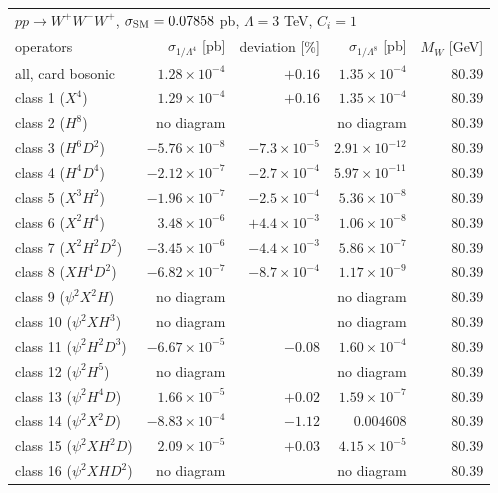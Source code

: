 \begin{table}[t]\centering\footnotesize\setlength{\tabcolsep}{4pt}
\begin{tabular}{@{}lrrrr@{}}\hline
\multicolumn{5}{l}{$p p \to W^+ W^- W^+$, $\sigma_{\rm SM} = 0.07858$ pb, $\Lambda = 3$ TeV, $C_i = 1$}\\
operators & $\sigma_{1/\Lambda^4}$ [pb] & deviation [\%] & $\sigma_{1/\Lambda^8}$ [pb] & $M_W$ [GeV]\\\hline
all, card bosonic & $1.28\times 10^{-4}$ & $+0.16$ & $1.35\times 10^{-4}$ & $80.39$\\
class 1 ($X^4$) & $1.29\times 10^{-4}$ & $+0.16$ & $1.35\times 10^{-4}$ & $80.39$\\
class 2 ($H^8$) & no diagram &  & no diagram & $80.39$\\
class 3 ($H^6 D^2$) & $-5.76\times 10^{-8}$ & $-7.3\times 10^{-5}$ & $2.91\times 10^{-12}$ & $80.39$\\
class 4 ($H^4 D^4$) & $-2.12\times 10^{-7}$ & $-2.7\times 10^{-4}$ & $5.97\times 10^{-11}$ & $80.39$\\
class 5 ($X^3 H^2$) & $-1.96\times 10^{-7}$ & $-2.5\times 10^{-4}$ & $5.36\times 10^{-8}$ & $80.39$\\
class 6 ($X^2 H^4$) & $3.48\times 10^{-6}$ & $+4.4\times 10^{-3}$ & $1.06\times 10^{-8}$ & $80.39$\\
class 7 ($X^2 H^2 D^2$) & $-3.45\times 10^{-6}$ & $-4.4\times 10^{-3}$ & $5.86\times 10^{-7}$ & $80.39$\\
class 8 ($X H^4 D^2$) & $-6.82\times 10^{-7}$ & $-8.7\times 10^{-4}$ & $1.17\times 10^{-9}$ & $80.39$\\
class 9 ($\psi^2 X^2 H$) & no diagram &  & no diagram & $80.39$\\
class 10 ($\psi^2 X H^3$) & no diagram &  & no diagram & $80.39$\\
class 11 ($\psi^2 H^2 D^3$) & $-6.67\times 10^{-5}$ & $-0.08$ & $1.60\times 10^{-4}$ & $80.39$\\
class 12 ($\psi^2 H^5$) & no diagram &  & no diagram & $80.39$\\
class 13 ($\psi^2 H^4 D$) & $1.66\times 10^{-5}$ & $+0.02$ & $1.59\times 10^{-7}$ & $80.39$\\
class 14 ($\psi^2 X^2 D$) & $-8.83\times 10^{-4}$ & $-1.12$ & $0.004608$ & $80.39$\\
class 15 ($\psi^2 X H^2 D$) & $2.09\times 10^{-5}$ & $+0.03$ & $4.15\times 10^{-5}$ & $80.39$\\
class 16 ($\psi^2 X H D^2$) & no diagram &  & no diagram & $80.39$\\

\end{tabular}
\end{table}
